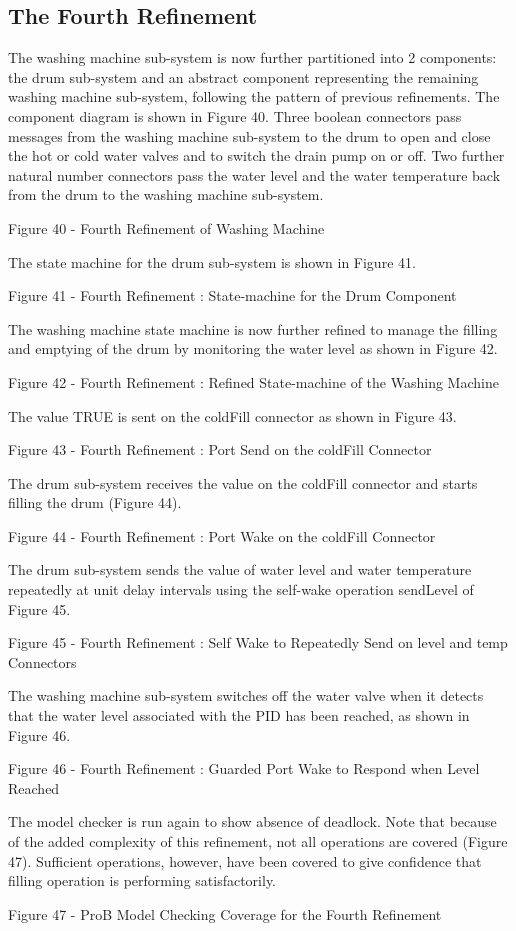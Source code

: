 \subsection{The Fourth Refinement}
\label{sec:component_diagrams-tutorial_fourthRefinement}

 
The washing machine sub-system is now further partitioned into 2 components: the drum sub-system and an abstract component representing the remaining washing machine sub-system, following the pattern of previous refinements.
The component diagram is shown in Figure 40.
Three boolean connectors pass messages from the washing machine sub-system to the drum to open and close the hot or cold water valves and to switch the drain pump on or off. Two further natural number connectors pass the water level and the water temperature back from the drum to the washing machine sub-system.
 
Figure 40 - Fourth Refinement of Washing Machine
 
The state machine for the drum sub-system is shown in Figure 41.
 
Figure 41 - Fourth Refinement : State-machine for the Drum Component
 
The washing machine state machine is now further refined to manage the filling and emptying of the drum by monitoring the water level as shown in Figure 42.
 
Figure 42 - Fourth Refinement : Refined State-machine of the Washing Machine
 
The value TRUE is sent on the coldFill connector as shown in Figure 43.
 
Figure 43 - Fourth Refinement : Port Send on the coldFill Connector
 
The drum sub-system receives the value on the coldFill connector and starts filling the drum (Figure 44).
 
Figure 44 - Fourth Refinement : Port Wake on the coldFill Connector
 
The drum sub-system sends the value of water level and water temperature repeatedly at unit delay intervals using the self-wake operation sendLevel of Figure 45.
 
Figure 45 - Fourth Refinement : Self Wake to Repeatedly Send on level and temp Connectors
 
The washing machine sub-system switches off the water valve when it detects that the water level associated with the PID has been reached, as shown in Figure 46.

 
Figure 46 - Fourth Refinement : Guarded Port Wake to Respond when Level Reached
 
The model checker is run again to show absence of deadlock. Note that because of the added complexity of this refinement, not all operations are covered (Figure 47). Sufficient operations, however, have been covered to give confidence that filling operation is performing satisfactorily.
 
Figure 47 - ProB Model Checking Coverage for the Fourth Refinement
 



